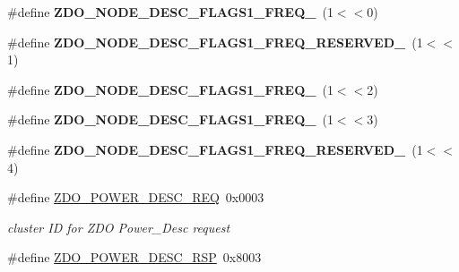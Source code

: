 \begin{DoxyCompactItemize}
\item 
\hypertarget{group__zdo_gabdea6b505cf180a055176641383e3b16}{\#define {\bfseries Z\-D\-O\-\_\-\-N\-O\-D\-E\-\_\-\-D\-E\-S\-C\-\_\-\-F\-L\-A\-G\-S1\-\_\-\-F\-R\-E\-Q\-\_}~(1$<$$<$0)}\label{group__zdo_gabdea6b505cf180a055176641383e3b16}

\item 
\hypertarget{group__zdo_gad8202e575692c98ef71cdba4f242dbe4}{\#define {\bfseries Z\-D\-O\-\_\-\-N\-O\-D\-E\-\_\-\-D\-E\-S\-C\-\_\-\-F\-L\-A\-G\-S1\-\_\-\-F\-R\-E\-Q\-\_\-\-R\-E\-S\-E\-R\-V\-E\-D\-\_}~(1$<$$<$1)}\label{group__zdo_gad8202e575692c98ef71cdba4f242dbe4}

\item 
\hypertarget{group__zdo_ga9341ad451dc0eb833c7b536b0f52f5cf}{\#define {\bfseries Z\-D\-O\-\_\-\-N\-O\-D\-E\-\_\-\-D\-E\-S\-C\-\_\-\-F\-L\-A\-G\-S1\-\_\-\-F\-R\-E\-Q\-\_}~(1$<$$<$2)}\label{group__zdo_ga9341ad451dc0eb833c7b536b0f52f5cf}

\item 
\hypertarget{group__zdo_ga76eff916f936a26c1d1d3bca683b4a5a}{\#define {\bfseries Z\-D\-O\-\_\-\-N\-O\-D\-E\-\_\-\-D\-E\-S\-C\-\_\-\-F\-L\-A\-G\-S1\-\_\-\-F\-R\-E\-Q\-\_}~(1$<$$<$3)}\label{group__zdo_ga76eff916f936a26c1d1d3bca683b4a5a}

\item 
\hypertarget{group__zdo_ga95ced39975281d36fd6d075c89a0c248}{\#define {\bfseries Z\-D\-O\-\_\-\-N\-O\-D\-E\-\_\-\-D\-E\-S\-C\-\_\-\-F\-L\-A\-G\-S1\-\_\-\-F\-R\-E\-Q\-\_\-\-R\-E\-S\-E\-R\-V\-E\-D\-\_}~(1$<$$<$4)}\label{group__zdo_ga95ced39975281d36fd6d075c89a0c248}

\item 
\hypertarget{group__zdo_ga6289766f3024daf25e1482536f78e2cc}{\#define \hyperlink{group__zdo_ga6289766f3024daf25e1482536f78e2cc}{Z\-D\-O\-\_\-\-P\-O\-W\-E\-R\-\_\-\-D\-E\-S\-C\-\_\-\-R\-E\-Q}~0x0003}\label{group__zdo_ga6289766f3024daf25e1482536f78e2cc}

\begin{DoxyCompactList}\small\item\em cluster I\-D for Z\-D\-O Power\-\_\-\-Desc request \end{DoxyCompactList}\item 
\hypertarget{group__zdo_ga346087460c7fc4356d01deb9e955bcd3}{\#define \hyperlink{group__zdo_ga346087460c7fc4356d01deb9e955bcd3}{Z\-D\-O\-\_\-\-P\-O\-W\-E\-R\-\_\-\-D\-E\-S\-C\-\_\-\-R\-S\-P}~0x8003}\label{group__zdo_ga346087460c7fc4356d01deb9e955bcd3}


\end{DoxyCompactItemize}
